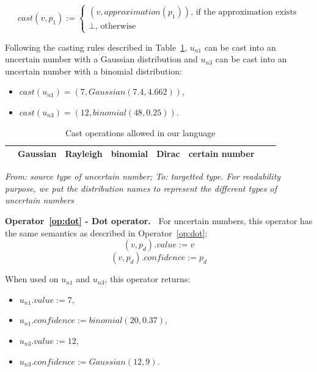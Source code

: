 $$cast(v, p_1) := \begin{cases}
 								(v, approximation(p_1)) \text{, if the approximation exists}\\
 								\perp \text{, otherwise}
 							\end{cases}$$

Following the casting rules described in Table~\ref{table:allowed-cast-op},  $u_{n1}$ can be cast into an uncertain number with a Gaussian distribution and $u_{n3}$ can be cast into an uncertain number with a binomial distribution:
\begin{itemize}
	\item $cast(u_{n1}) = (7, Gaussian(7.4, 4.662))$,
	\item $cast(u_{n3}) = (12, binomial(48, 0.25))$.
\end{itemize}

\begin{table}
	\begin{center}
		\begin{tabular}{|c|c|c|c|c|c|c|c|}
			\hline	
			\diagbox{To}{From} & Gaussian & Rayleigh & binomial & Dirac & certain number\\
			\hline
			\hline
		\end{tabular}%
	\end{center}
	{\small
	\textit{From: source type of uncertain number; To: targetted type. For readability purpose, we put the distribution names to represent the different types of uncertain numbers}
	}
	\caption{Cast operations allowed in our language}
	\label{table:allowed-cast-op}
\end{table}

\bigskip

\noindent\textbf{Operator~\ref{op:dot} - Dot operator.~}
For uncertain numbers, this operator has the same semantics as described in Operator~\ref{op:dot}:
$$(v, p_d).value := v$$
$$(v, p_d).confidence := p_d$$

When used on $u_{n1}$ and $u_{n3}$, this operator returns:
\begin{itemize}
	\item $u_{n1}.value := 7$,
	\item $u_{n1}.confidence := binomial(20, 0.37)$,
	\item $u_{n3}.value := 12$,
	\item $u_{n3}.confidence := Gaussian(12, 9)$.
\end{itemize}

